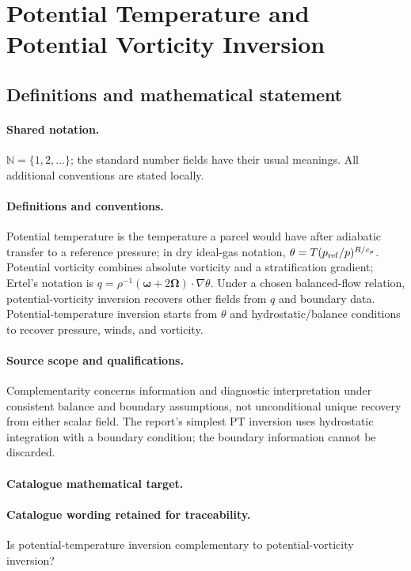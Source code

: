 \documentclass[11pt]{article}
\begin{document}
\section{Potential Temperature and Potential Vorticity Inversion}\label{statement}

\subsection{Definitions and mathematical statement}

\paragraph{Shared notation.}$\mathbb N=\{1,2,\ldots\}$; the standard number fields have their usual meanings. All additional conventions are stated locally.


\paragraph{Definitions and conventions.} Potential temperature is the temperature a parcel would have after adiabatic transfer to a reference pressure; in dry ideal-gas notation, $\theta=T(p_{\rm ref}/p)^{R/c_p}$. Potential vorticity combines absolute vorticity and a stratification gradient; Ertel's notation is $q=\rho^{-1}(\boldsymbol\omega+2\boldsymbol\Omega)\cdot\nabla\theta$. Under a chosen balanced-flow relation, potential-vorticity inversion recovers other fields from $q$ and boundary data. Potential-temperature inversion starts from $\theta$ and hydrostatic/balance conditions to recover pressure, winds, and vorticity.

\paragraph{Source scope and qualifications.} Complementarity concerns information and diagnostic interpretation under consistent balance and boundary assumptions, not unconditional unique recovery from either scalar field. The report's simplest PT inversion uses hydrostatic integration with a boundary condition; the boundary information cannot be discarded.

\paragraph{Catalogue mathematical target.}
\paragraph{Catalogue wording retained for traceability.}
Is potential-temperature inversion complementary to potential-vorticity inversion?
\end{document}
